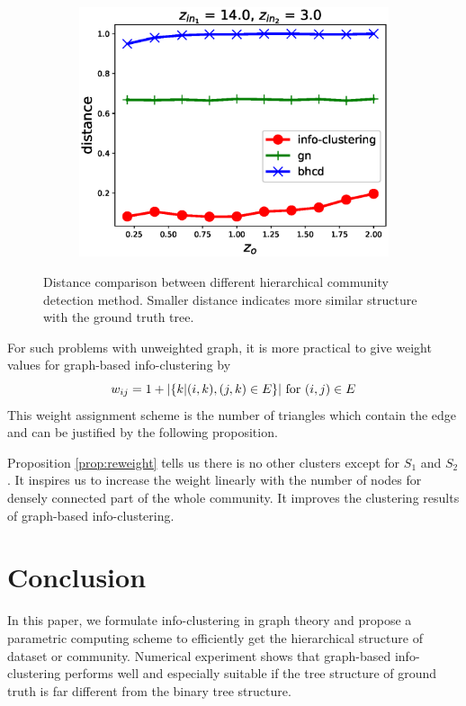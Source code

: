 \documentclass{article}
\begin{document}
\begin{figure}
\begin{subfigure}{0.33\textwidth}
		\includegraphics[width=\textwidth]{pic/z_o.eps}
		\caption{}
	\end{subfigure}
	\caption{Distance comparison between different hierarchical community detection method. Smaller distance indicates more similar structure with the ground truth tree.}\label{fig:cdr}	
\end{figure}

For such problems with unweighted graph, it is more practical to give weight values for graph-based info-clustering by 
\begin{equation}
    w_{ij} = 1 + \lvert\{k | (i,k),(j,k) \in E \}\rvert \textrm{ for } (i,j) \in E
\end{equation}
This weight assignment scheme is the number of triangles which contain the edge and can be justified by the following proposition.



Proposition \ref{prop:reweight} tells us there is no other clusters except for $S_1$ and  $S_2$. It inspires us to increase the weight linearly with the number of nodes for densely connected part of the whole community. It improves the clustering results of graph-based info-clustering.



\section{Conclusion}\label{sec:conclusion}
In this paper, we formulate info-clustering in graph theory and propose a parametric computing scheme to efficiently get the hierarchical structure of dataset or community. Numerical experiment shows that graph-based info-clustering performs well and especially suitable if the tree structure of ground truth is far different from the binary tree structure.






\end{document}
